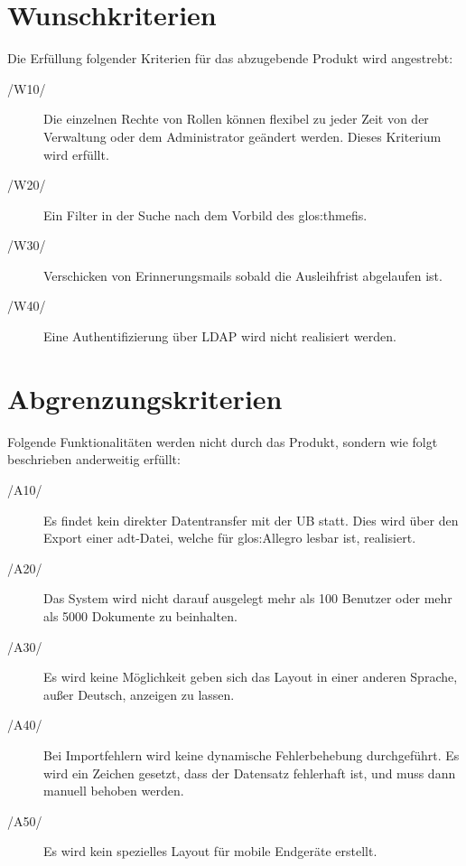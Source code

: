 \section{Wunschkriterien}
Die Erfüllung folgender Kriterien für das abzugebende Produkt wird angestrebt:
\begin{description}
  \item[/W10/] Die einzelnen Rechte von Rollen können flexibel zu jeder Zeit
	von der Verwaltung oder dem Administrator geändert werden. Dieses
	Kriterium wird erfüllt.
  \item[/W20/] Ein Filter in der Suche nach dem Vorbild des \gls{glos:thmefi}s.
  \item[/W30/] Verschicken von Erinnerungsmails sobald die Ausleihfrist
	abgelaufen ist.
  \item[/W40/] Eine Authentifizierung über \gls{LDAP} wird nicht realisiert werden.
\end{description}

\section{Abgrenzungskriterien}
Folgende Funktionalitäten werden nicht durch das Produkt, sondern wie folgt
beschrieben anderweitig erfüllt:
\begin{description}
\item[/A10/] Es findet kein direkter Datentransfer mit der \gls{UB} statt.
	Dies wird über den Export einer adt-Datei, welche für \gls{glos:Allegro}
	lesbar ist, realisiert.
  \item[/A20/] Das System wird nicht darauf ausgelegt mehr als 100 Benutzer
	oder mehr als 5000 Dokumente zu beinhalten.
  \item[/A30/] Es wird keine Möglichkeit geben sich das Layout in einer anderen
	Sprache, außer Deutsch, anzeigen zu lassen.
  \item[/A40/] Bei Importfehlern wird keine dynamische Fehlerbehebung 
	durchgeführt. Es wird ein Zeichen gesetzt, dass der Datensatz fehlerhaft
	ist, und muss dann manuell behoben werden.
  \item[/A50/] Es wird kein spezielles Layout für mobile Endgeräte erstellt.
\end{description}
